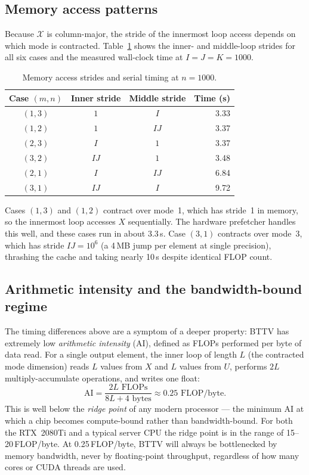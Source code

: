 \documentclass[11pt]{article}
\begin{document}
\subsection{Memory access patterns}

Because $\mathcal{X}$ is column-major, the stride of the innermost loop
access depends on which mode is contracted.  Table~\ref{tab:memory} shows
the inner- and middle-loop strides for all six cases and the measured
wall-clock time at $I=J=K=1000$.

\begin{table}[h]
\centering
\caption{Memory access strides and serial timing at $n=1000$.}
\label{tab:memory}
\begin{tabular}{cccr}
\toprule
Case $(m,n)$ & Inner stride & Middle stride & Time (s) \\
\midrule
$(1,3)$ & $1$    & $I$   & 3.33 \\
$(1,2)$ & $1$    & $IJ$  & 3.37 \\
$(2,3)$ & $I$    & $1$   & 3.37 \\
$(3,2)$ & $IJ$   & $1$   & 3.48 \\
$(2,1)$ & $I$    & $IJ$  & 6.84 \\
$(3,1)$ & $IJ$   & $I$   & 9.72 \\
\bottomrule
\end{tabular}
\end{table}

Cases $(1,3)$ and $(1,2)$ contract over mode~1, which has stride~1 in
memory, so the innermost loop accesses $X$ sequentially.  The hardware
prefetcher handles this well, and these cases run in about 3.3\,s.
Case $(3,1)$ contracts over mode~3, which has stride $IJ = 10^6$ (a
4\,MB jump per element at single precision), thrashing the cache and
taking nearly 10\,s despite identical FLOP count.

\subsection{Arithmetic intensity and the bandwidth-bound regime}

The timing differences above are a symptom of a deeper property: BTTV
has extremely low \emph{arithmetic intensity} (AI), defined as FLOPs
performed per byte of data read.  For a single output element, the inner
loop of length $L$ (the contracted mode dimension) reads $L$ values from
$X$ and $L$ values from $U$, performs $2L$ multiply-accumulate operations,
and writes one float:
\[
  \text{AI} = \frac{2L \text{ FLOPs}}{8L + 4 \text{ bytes}} \approx 0.25 \text{ FLOP/byte.}
\]
This is well below the \emph{ridge point} of any modern processor ---
the minimum AI at which a chip becomes compute-bound rather than
bandwidth-bound.  For both the RTX~2080Ti and a typical server CPU the
ridge point is in the range of 15--20\,FLOP/byte.  At 0.25\,FLOP/byte,
BTTV will always be bottlenecked by memory bandwidth, never by floating-point
throughput, regardless of how many cores or CUDA threads are used.
\end{document}
